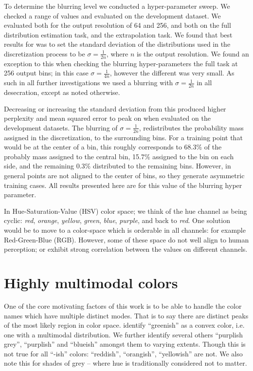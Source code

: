 To determine the blurring level we conducted a hyper-parameter sweep.
We checked a range of values and evaluated on the development dataset.
We evaluated both for the output resolution of 64 and 256, and both on the full distribution estimation task, and the extrapolation task.
We found that best results for was to set the standard deviation of the distributions used in the discretization process to be $\sigma=\frac{1}{2n}$, where $n$ is the output resolution.
We found an exception to this when checking the blurring hyper-parameters the full task at 256 output bins; in this case $\sigma=\frac{1}{4n}$, however the different was very small.
As such in all further investigations we used a blurring with $\sigma=\frac{1}{2n}$ in all desecration, except as noted otherwise.

Decreasing or increasing the standard deviation from this produced higher perplexity and mean squared error to peak on when evaluated on the development datasets.
The blurring of $\sigma=\frac{1}{2n}$, redistributes the probability mass assigned in the discretization, to the surrounding bins.
For a training point that would be at the center of a bin, this roughly corresponds to 68.3\% of the probably mass assigned to the central bin, 15.7\% assigned to the bin on each side, and the remaining 0.3\% distributed to the remaining bins.
However, in general points are not aligned to the center of bins, so they generate asymmetric training cases.
All results presented here are for this value of the blurring hyper parameter.



In Hue-Saturation-Value (HSV) color space; we think of the hue channel 
as being cyclic: \emph{red}, \emph{orange}, \emph{yellow}, \emph{green}, \emph{blue}, \emph{purple}, and back to \emph{red}.
One solution would be to move to a color-space which is orderable in all channels: for example Red-Green-Blue (RGB).
However, some of these space do not well align to human perception; or exhibit strong correlation between the values on different channels.


\section{Highly multimodal colors}\label{sec:highly-multimodal-colors}
One of the core motivating factors of this work is to be able to handle the color names which have multiple distinct modes.
That is to say there are distinct peaks of the most likely region in color space.
\textcite{mcmahan2015bayesian} identify ``greenish'' as a convex color, i.e. one with a multimodal distribution.
We further identify several others ``purplish grey'', ``purplish'' and ``blueish'' amongst them to varying extents.
Though this is not true for all ``-ish'' colors: ``reddish'', ``orangish'', ``yellowish'' are not.
We also note this for shades of grey -- where hue is traditionally considered not to matter.




